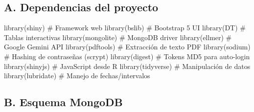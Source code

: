 \documentclass[
  spanish,
  11pt,
  a4paper,
]{article}
\newenvironment{Shaded}{\begin{snugshade}}{\end{snugshade}}
\newcommand{\CommentTok}[1]{\textcolor[rgb]{0.37,0.37,0.37}{#1}}
\newcommand{\FunctionTok}[1]{\textcolor[rgb]{0.28,0.35,0.67}{#1}}
\newcommand{\NormalTok}[1]{\textcolor[rgb]{0.00,0.23,0.31}{#1}}
\begin{document}
\subsection{A. Dependencias del
proyecto}\label{a.-dependencias-del-proyecto}

\begin{Shaded}
\begin{Highlighting}[]
\FunctionTok{library}\NormalTok{(shiny)        }\CommentTok{\# Framework web}
\FunctionTok{library}\NormalTok{(bslib)        }\CommentTok{\# Bootstrap 5 UI}
\FunctionTok{library}\NormalTok{(DT)           }\CommentTok{\# Tablas interactivas}
\FunctionTok{library}\NormalTok{(mongolite)    }\CommentTok{\# MongoDB driver}
\FunctionTok{library}\NormalTok{(ellmer)       }\CommentTok{\# Google Gemini API}
\FunctionTok{library}\NormalTok{(pdftools)     }\CommentTok{\# Extracción de texto PDF}
\FunctionTok{library}\NormalTok{(sodium)       }\CommentTok{\# Hashing de contraseñas (scrypt)}
\FunctionTok{library}\NormalTok{(digest)       }\CommentTok{\# Tokens MD5 para auto{-}login}
\FunctionTok{library}\NormalTok{(shinyjs)      }\CommentTok{\# JavaScript desde R}
\FunctionTok{library}\NormalTok{(tidyverse)    }\CommentTok{\# Manipulación de datos}
\FunctionTok{library}\NormalTok{(lubridate)    }\CommentTok{\# Manejo de fechas/intervalos}
\end{Highlighting}
\end{Shaded}

\subsection{B. Esquema MongoDB}\label{b.-esquema-mongodb}
\end{document}
